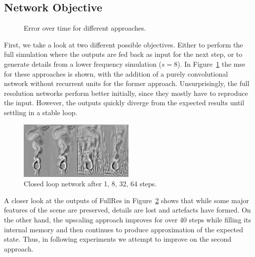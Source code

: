 \documentclass[sigconf]{acmart}
\begin{document}
\subsection{Network Objective}\label{sec:eva:objective}
\begin{figure}
	\caption{Error over time for different approaches.}
	\label{objectiveError}
\end{figure}
First, we take a look at two different possible objectives. Either to perform the full simulation where the outputs are fed back as input for the next step, or to generate details from a lower frequency simulation ($s=8$).
In Figure~\ref{objectiveError} the mse for these approaches is shown, with the addition of a purely convolutional network without recurrent units for the former approach. Unsurprisingly, the full resolution networks perform better initially, since they mostly have to reproduce the input. However, the outputs quickly diverge from the expected results until settling in a stable loop.
\begin{figure}
	\includegraphics[width=0.5\textwidth]{imgs/fullres_series.png}
	\caption{Closed loop network after 1, 8, 32, 64 steps.}
	\label{closedLoop}
\end{figure}
A closer look at the outputs of FullRes in Figure~\ref{closedLoop} shows that while some major features of the scene are preserved, details are lost and artefacts have formed. On the other hand, the upscaling approach improves for over 40 steps while filling its internal memory and then continues to produce approximation of the expected state. Thus, in following experiments we attempt to improve on the second approach.
\end{document}
